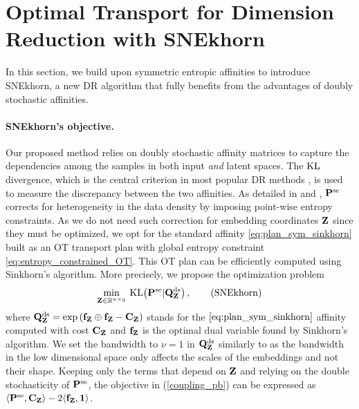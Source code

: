 
\section{Optimal Transport for Dimension Reduction with SNEkhorn}\label{sec:DR_with_OT}

In this section, we build upon symmetric entropic affinities to introduce SNEkhorn, a new DR algorithm that fully benefits from the advantages of doubly stochastic affinities.

\paragraph{SNEkhorn's objective.} Our proposed method relies on doubly stochastic affinity matrices to capture the dependencies among the samples in both input \emph{and} latent spaces. The $\operatorname{KL}$ divergence, which is the central criterion in most popular DR methods \citep{van2022probabilistic}, is used to measure the discrepancy between the two affinities. As detailed in  and , $\mathbf{P}^{\mathrm{se}}$ corrects for heterogeneity in the
data density by imposing point-wise entropy constraints. As we do not need such correction for embedding coordinates $\mathbf{Z}$ since they must be optimized, we opt for the standard affinity \eqref{eq:plan_sym_sinkhorn} built as an OT transport plan with global entropy constraint \eqref{eq:entropy_constrained_OT}. This OT plan can be efficiently computed using Sinkhorn's algorithm. More precisely, 
we propose the optimization problem
\begin{align}\label{coupling_pb}
    \min_{\mathbf{Z} \in \mathbb{R}^{n \times q}} \:  \mathrm{KL}\big(\mathbf{P}^{\mathrm{se}} | \mathbf{Q}^{\mathrm{ds}}_{\mathbf{Z}} \big)\,,
\tag{SNEkhorn}
\end{align}
where $\mathbf{Q}^{\mathrm{ds}}_{\mathbf{Z}} = \exp \left(\mathbf{f}_{\mathbf{Z}} \oplus \mathbf{f}_{\mathbf{Z}} - \mathbf{C}_{\mathbf{Z}} \right)$ stands for the $\eqref{eq:plan_sym_sinkhorn}$ affinity computed with cost $\mathbf{C}_{\mathbf{Z}}$ and $\mathbf{f}_{\mathbf{Z}}$ is the optimal dual variable found by Sinkhorn's algorithm.
We set the bandwidth to $\nu = 1$ in $\mathbf{Q}^{\mathrm{ds}}_{\mathbf{Z}}$ similarly to \citep{van2008visualizing} as the bandwidth in the low dimensional space only affects the scales of the embeddings and not their shape.
Keeping only the terms that depend on $\mathbf{Z}$ and relying on the double stochasticity of $\mathbf{P}^{\mathrm{se}}$, the objective in (\ref{coupling_pb}) can be expressed as $\langle \mathbf{P}^{\mathrm{se}}, \mathbf{C}_{\mathbf{Z}} \rangle - 2 \langle \mathbf{f}_{\mathbf{Z}}, \bm{1} \rangle$. %

